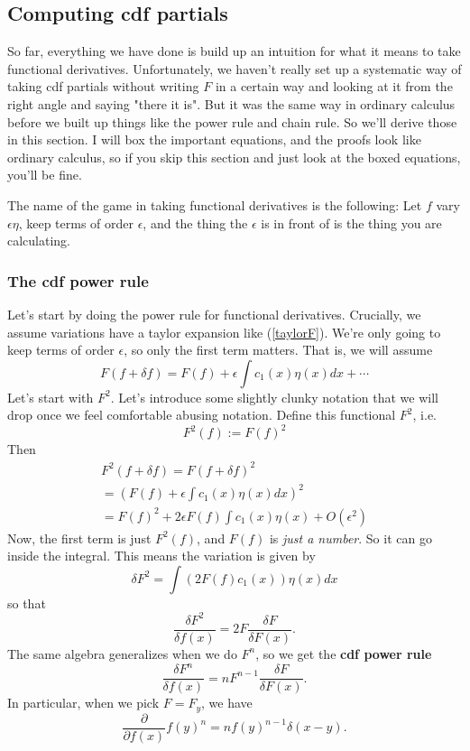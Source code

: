 \documentclass[main.tex]{subfiles}
\begin{document}
\subsection{Computing cdf partials}
So far, everything we have done is build up an intuition for what it means to take functional derivatives. Unfortunately, we haven't really set up a systematic way of taking cdf partials without writing $F$ in a certain way and looking at it from the right angle and saying "there it is". But it was the same way in ordinary calculus before we built up things like the power rule and chain rule. So we'll derive those in this section. I will box the important equations, and the proofs look like ordinary calculus, so if you skip this section and just look at the boxed equations, you'll be fine.

The name of the game in taking functional derivatives is the following: Let $f$ vary $\epsilon \eta$, keep terms of order $\epsilon$, and the thing the $\epsilon$ is in front of is the thing you are calculating.

\subsubsection{The cdf power rule}
Let's start by doing the power rule for functional derivatives. Crucially, we assume variations have a taylor expansion like (\ref{taylorF}). We're only going to keep terms of order $\epsilon$, so only the first term matters. That is, we will assume
\begin{equation} \label{varF}
F(f + \delta f) = F(f) + \epsilon \int c_1 (x) \eta(x) dx + \cdots 
\end{equation}
Let's start with $F^2$. Let's introduce some slightly clunky notation that we will drop once we feel comfortable abusing notation. Define this functional $F^2$, i.e.
\[
F^2(f) := F(f)^2
\]
Then
\begin{align*}
F^2(f + \delta f) = F(f + \delta f)^2 \\ =
\left(F(f) + \epsilon \int c_1 (x) \eta(x) dx \right)^2 \\ =
F(f)^2 + 2\epsilon F(f) \int c_1 (x) \eta(x) + O(\epsilon^2)
\end{align*}
Now, the first term is just $F^2(f)$, and $F(f)$ is \textit{just a number}. So it can go inside the integral. This means the variation is given by
\[
\delta F^2 = \int \left( 2 F(f) c_1 (x) \right) \eta(x) dx
\]
so that
\[
\frac{\delta F^2}{\delta f(x)} = 2F \frac{\delta F}{\delta F(x)}.
\]
The same algebra generalizes when we do $F^n$, so we get the \textbf{cdf power rule}
\begin{equation} \label{cdfpower}
\boxed{\frac{\delta F^n}{\delta f(x)} = n F^{n-1} \frac{\delta F}{\delta F(x)}.}
\end{equation}
In particular, when we pick $F = F_y$, we have
\[
\frac{\partial}{\partial f(x)} f(y)^n = n f(y)^{n-1} \delta(x-y).
\]
\end{document}
